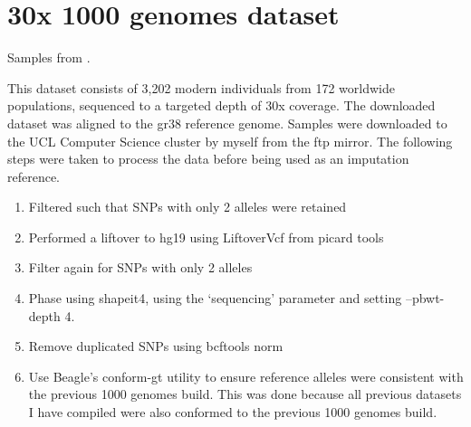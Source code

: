 \section{30x 1000 genomes dataset} \label{section:1000genomes}


Samples from \cite{byrska2021high}.

This dataset consists of 3,202 modern individuals from 172 worldwide populations, sequenced to a targeted depth of 30x coverage. The downloaded dataset was aligned to the gr38 reference genome. Samples were downloaded to the UCL Computer Science cluster by myself from the ftp mirror. The following steps were taken to process the data before being used as an imputation reference. 

\begin{enumerate}
\item Filtered such that SNPs with only 2 alleles were retained
\item Performed a liftover to hg19 using LiftoverVcf from picard tools \cite{Picard2018toolkit}
\item Filter again for SNPs with only 2 alleles
\item Phase using shapeit4, using the `sequencing' parameter and setting --pbwt-depth 4.
\item Remove duplicated SNPs using bcftools norm \cite{li2009sequence} 
\item Use Beagle's conform-gt utility to ensure reference alleles were consistent with the previous 1000 genomes build. This was done because all previous datasets I have compiled were also conformed to the previous 1000 genomes build. 
\end{enumerate}

\begingroup\fontsize{10}{10}\selectfont


